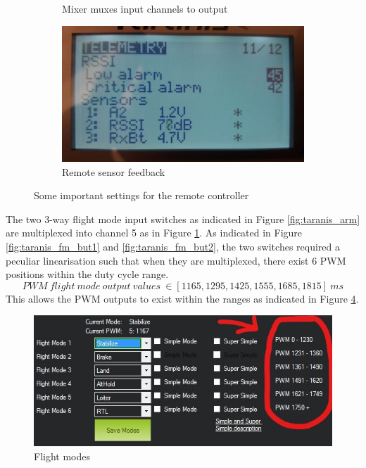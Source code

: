 \begin{figure}[H]
\begin{subfigure}{0.5\textwidth}
\caption{Mixer muxes input channels to output}
\label{fig:taranis_mux}
\end{subfigure}
\begin{subfigure}{0.5\textwidth}
\centering
\includegraphics[scale=0.13]{images/lcd/telemetry.jpg}
\caption{Remote sensor feedback}
\label{fig:taranis_telemetry}
\end{subfigure}
\caption{Some important settings for the remote controller}
\label{fig:taranis_lcd}
\end{figure}

The two 3-way flight mode input switches as indicated in Figure \ref{fig:taranis_arm} are multiplexed into channel 5 as in Figure \ref{fig:taranis_mux}. As indicated in Figure \ref{fig:taranis_fm_but1} and \ref{fig:taranis_fm_but2}, the two switches required a peculiar linearisation such that when they are multiplexed, there exist 6 PWM positions within the duty cycle range. \begin{equation}PWM\ flight\ mode\ output\ values\ \in [1165, 1295, 1425, 1555, 1685, 1815]\ ms\end{equation}
This allows the PWM outputs to exist within the ranges as indicated in Figure \ref{fig:flight_modes}.

\begin{figure}[H]
\centering
\includegraphics[scale=0.5]{images/flight_modes.JPG}
\caption{Flight modes}
\label{fig:flight_modes}
\end{figure}

